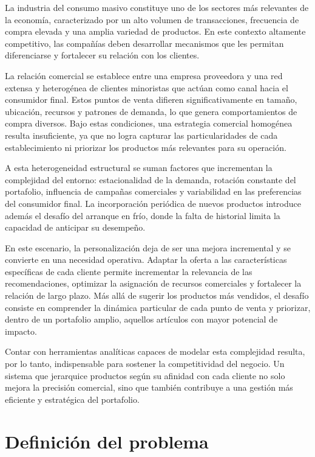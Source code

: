 La industria del consumo masivo constituye uno de los sectores más relevantes de la economía, caracterizado por un alto volumen de transacciones, frecuencia de compra elevada y una amplia variedad de productos. En este contexto altamente competitivo, las compañías deben desarrollar mecanismos que les permitan diferenciarse y fortalecer su relación con los clientes.

La relación comercial se establece entre una empresa proveedora y una red extensa y heterogénea de clientes minoristas que actúan como canal hacia el consumidor final. Estos puntos de venta difieren significativamente en tamaño, ubicación, recursos y patrones de demanda, lo que genera comportamientos de compra diversos. Bajo estas condiciones, una estrategia comercial homogénea resulta insuficiente, ya que no logra capturar las particularidades de cada establecimiento ni priorizar los productos más relevantes para su operación.

A esta heterogeneidad estructural se suman factores que incrementan la complejidad del entorno: estacionalidad de la demanda, rotación constante del portafolio, influencia de campañas comerciales y variabilidad en las preferencias del consumidor final. La incorporación periódica de nuevos productos introduce además el desafío del arranque en frío, donde la falta de historial limita la capacidad de anticipar su desempeño.

En este escenario, la personalización deja de ser una mejora incremental y se convierte en una necesidad operativa. Adaptar la oferta a las características específicas de cada cliente permite incrementar la relevancia de las recomendaciones, optimizar la asignación de recursos comerciales y fortalecer la relación de largo plazo. Más allá de sugerir los productos más vendidos, el desafío consiste en comprender la dinámica particular de cada punto de venta y priorizar, dentro de un portafolio amplio, aquellos artículos con mayor potencial de impacto.

Contar con herramientas analíticas capaces de modelar esta complejidad resulta, por lo tanto, indispensable para sostener la competitividad del negocio. Un sistema que jerarquice productos según su afinidad con cada cliente no solo mejora la precisión comercial, sino que también contribuye a una gestión más eficiente y estratégica del portafolio.


\section{Definición del problema}

